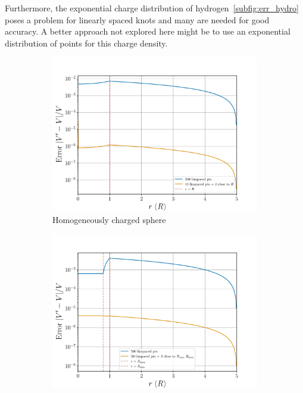 \documentclass[a4paper,DIV=12,english]{scrartcl}
\begin{document}
Furthermore, the exponential charge distribution of hydrogen~\ref{subfig:err_hydro} poses a problem for linearly spaced knots and many are needed for good accuracy. A better approach not explored here might be to use an exponential distribution of points for this charge density.
\begin{figure}
    \centering
    \begin{subfigure}{0.49\textwidth}
        \centering
        \includegraphics[width=\textwidth]{../plots/potential_error/error_solidsphere_test.pdf}
        \caption{Homogeneously charged sphere}
        \label{subfig:err_sphere}
    \end{subfigure}
    \begin{subfigure}{0.49\textwidth}
        \centering
        \includegraphics[width=\textwidth]{../plots/potential_error/error_shell_test.pdf}

\end{subfigure}
\end{figure}
\end{document}
